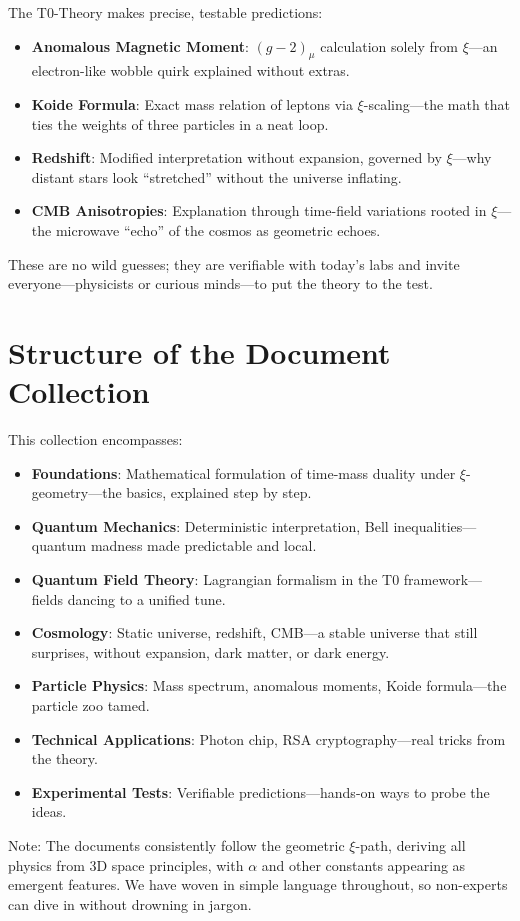 	The T0-Theory makes precise, testable predictions:
	
	\begin{foundation}
		\begin{itemize}
			\item \textbf{Anomalous Magnetic Moment}: $(g-2)_\mu$ calculation solely from $\xi$—an electron-like wobble quirk explained without extras.
			\item \textbf{Koide Formula}: Exact mass relation of leptons via $\xi$-scaling—the math that ties the weights of three particles in a neat loop.
			\item \textbf{Redshift}: Modified interpretation without expansion, governed by $\xi$—why distant stars look ``stretched'' without the universe inflating.
			\item \textbf{CMB Anisotropies}: Explanation through time-field variations rooted in $\xi$—the microwave ``echo'' of the cosmos as geometric echoes.
		\end{itemize}
	\end{foundation}
	
	These are no wild guesses; they are verifiable with today's labs and invite everyone—physicists or curious minds—to put the theory to the test.
	
	\section{Structure of the Document Collection}
	
	This collection encompasses:
	
	\begin{itemize}
		\item \textbf{Foundations}: Mathematical formulation of time-mass duality under $\xi$-geometry—the basics, explained step by step.
		\item \textbf{Quantum Mechanics}: Deterministic interpretation, Bell inequalities—quantum madness made predictable and local.
		\item \textbf{Quantum Field Theory}: Lagrangian formalism in the T0 framework—fields dancing to a unified tune.
		\item \textbf{Cosmology}: Static universe, redshift, CMB—a stable universe that still surprises, without expansion, dark matter, or dark energy.
		\item \textbf{Particle Physics}: Mass spectrum, anomalous moments, Koide formula—the particle zoo tamed.
		\item \textbf{Technical Applications}: Photon chip, RSA cryptography—real tricks from the theory.
		\item \textbf{Experimental Tests}: Verifiable predictions—hands-on ways to probe the ideas.
	\end{itemize}
	
	Note: The documents consistently follow the geometric $\xi$-path, deriving all physics from 3D space principles, with $\alpha$ and other constants appearing as emergent features. We have woven in simple language throughout, so non-experts can dive in without drowning in jargon.
	